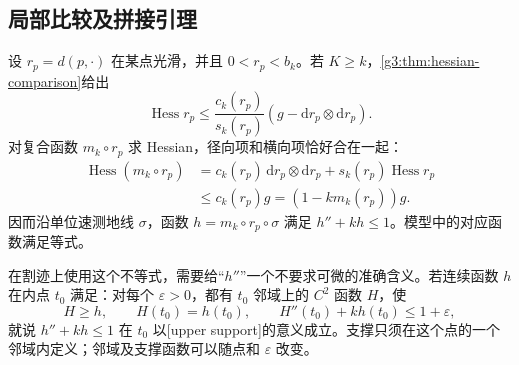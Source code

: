 \subsection{局部比较及拼接引理}
\label{g3:subsec:0903:02}

设 \(r_p=d(p,\cdot)\) 在某点光滑，并且 \(0<r_p<b_k\)。若 \(K\ge k\)，\cref{g3:thm:hessian-comparison}给出
\[
 \operatorname{Hess}r_p\le\frac{c_k(r_p)}{s_k(r_p)}
 (g-\mathrm dr_p\otimes\mathrm dr_p).
\]
对复合函数 \(m_k\circ r_p\) 求 Hessian，径向项和横向项恰好合在一起：
\begin{equation}\label{g3:eq:modified-distance-hessian-smooth}
 \begin{split}
 \operatorname{Hess}(m_k\circ r_p)
 &=c_k(r_p)\,\mathrm dr_p\otimes\mathrm dr_p
   +s_k(r_p)\operatorname{Hess}r_p\\
 &\le c_k(r_p)g=(1-km_k(r_p))g.
 \end{split}
\end{equation}
因而沿单位速测地线 \(\sigma\)，函数 \(h=m_k\circ r_p\circ\sigma\) 满足 \(h''+kh\le1\)。模型中的对应函数满足等式。

\ProseParagraphBreak

在割迹上使用这个不等式，需要给“\(h''\)”一个不要求可微的准确含义。若连续函数 \(h\) 在内点 \(t_0\) 满足：对每个 \(\varepsilon>0\)，都有 \(t_0\) 邻域上的 \(C^2\) 函数 \(H\)，使
\begin{equation}\label{g3:eq:one-dimensional-upper-support}
 H\ge h,\qquad H(t_0)=h(t_0),\qquad
 H''(t_0)+kh(t_0)\le1+\varepsilon,
\end{equation}
就说 \(h''+kh\le1\) 在 \(t_0\) 以[upper support]的意义成立。支撑只须在这个点的一个邻域内定义；邻域及支撑函数可以随点和 \(\varepsilon\) 改变。

